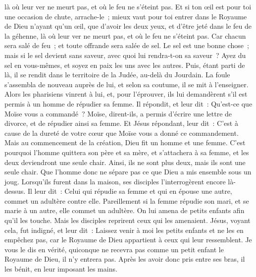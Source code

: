 \begin{multicols}{2}
là où leur ver ne meurt pas, et où le feu ne s'éteint pas.
Et si ton œil est pour toi une occasion de chute, arrache-le~; mieux vaut pour toi entrer dans le Royaume de Dieu n'ayant qu'un œil, que d'avoir les deux yeux, et d'être jeté dans le feu de la géhenne,
là où leur ver ne meurt pas, et où le feu ne s'éteint pas.
Car chacun sera salé de feu~; et toute offrande sera salée de sel.
Le sel est une bonne chose~; mais si le sel devient sans saveur, avec quoi lui rendra-t-on sa saveur~?
Ayez du sel en vous-mêmes, et soyez en paix les uns avec les autres.
\VerseOne{}Puis, étant parti de là, il se rendit dans le territoire de la Judée, au-delà du Jourdain. La foule s'assembla de nouveau auprès de lui, et selon sa coutume, il se mit à l'enseigner.
Alors les pharisiens vinrent à lui, et, pour l'éprouver, ils lui demandèrent s'il est permis à un homme de répudier sa femme.
Il répondit, et leur dit~: Qu'est-ce que Moïse vous a commandé~?
Moïse, dirent-ils, a permis d'écrire une lettre de divorce, et de répudier ainsi sa femme.
Et Jésus répondant, leur dit~: C'est à cause de la dureté de votre cœur que Moïse vous a donné ce commandement.
Mais au commencement de la création, Dieu fit un homme et une femme.
C'est pourquoi l'homme quittera son père et sa mère, et s'attachera à sa femme,
et les deux deviendront une seule chair. Ainsi, ils ne sont plus deux, mais ils sont une seule chair.
Que l'homme donc ne sépare pas ce que Dieu a mis ensemble sous un joug.
Lorsqu'ils furent dans la maison, ses disciples l'interrogèrent encore là-dessus.
Il leur dit~: Celui qui répudie sa femme et qui en épouse une autre, commet un adultère contre elle.
Pareillement si la femme répudie son mari, et se marie à un autre, elle commet un adultère.
On lui amena de petits enfants afin qu'il les touche. Mais les disciples reprirent ceux qui les amenaient.
Jésus, voyant cela, fut indigné, et leur dit~: Laissez venir à moi les petits enfants et ne les en empêchez pas, car le Royaume de Dieu appartient à ceux qui leur ressemblent.
Je vous le dis en vérité, quiconque ne recevra pas comme un petit enfant le Royaume de Dieu, il n'y entrera pas.
Après les avoir donc pris entre ses bras, il les bénit, en leur imposant les mains.

\end{multicols}
